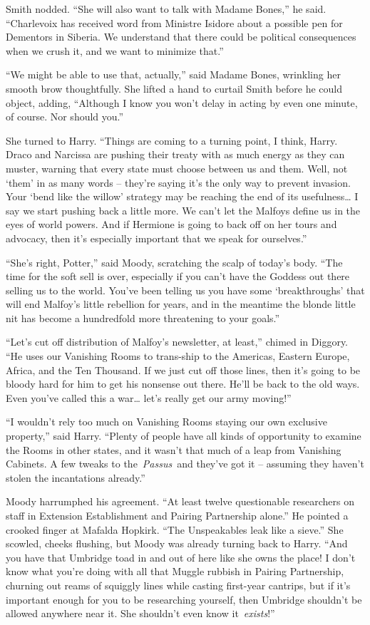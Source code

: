 Smith nodded. ``She will also want to talk with Madame Bones,'' he said.
``Charlevoix has received word from Ministre Isidore about a possible
pen for Dementors in Siberia. We understand that there could be
political consequences when we crush it, and we want to minimize that.''

``We might be able to use that, actually,'' said Madame Bones, wrinkling
her smooth brow thoughtfully. She lifted a hand to curtail Smith before
he could object, adding, ``Although I know you won't delay in acting by
even one minute, of course. Nor should you.''

She turned to Harry. ``Things are coming to a turning point, I think,
Harry. Draco and Narcissa are pushing their treaty with as much energy
as they can muster, warning that every state must choose between us and
them. Well, not `them' in as many words -- they're saying it's the only
way to prevent invasion. Your `bend like the willow' strategy may be
reaching the end of its usefulness\ldots{} I say we start pushing back a
little more. We can't let the Malfoys define us in the eyes of world
powers. And if Hermione is going to back off on her tours and advocacy,
then it's especially important that we speak for ourselves.''

``She's right, Potter,'' said Moody, scratching the scalp of today's
body. ``The time for the soft sell is over, especially if you can't have
the Goddess out there selling us to the world. You've been telling us
you have some `breakthroughs' that will end Malfoy's little rebellion
for years, and in the meantime the blonde little nit has become a
hundredfold more threatening to your goals.''

``Let's cut off distribution of Malfoy's newsletter, at least,'' chimed
in Diggory. ``He uses our Vanishing Rooms to trans-ship to the Americas,
Eastern Europe, Africa, and the Ten Thousand. If we just cut off those
lines, then it's going to be bloody hard for him to get his nonsense out
there. He'll be back to the old ways. Even you've called this a
war\ldots{} let's really get our army moving!''

``I wouldn't rely too much on Vanishing Rooms staying our own exclusive
property,'' said Harry. ``Plenty of people have all kinds of opportunity
to examine the Rooms in other states, and it wasn't that much of a leap
from Vanishing Cabinets. A few tweaks to the~\emph{Passus}~and they've
got it -- assuming they haven't stolen the incantations already.''

Moody harrumphed his agreement. ``At least twelve questionable
researchers on staff in Extension Establishment and Pairing Partnership
alone.'' He pointed a crooked finger at Mafalda Hopkirk. ``The
Unspeakables leak like a sieve.'' She scowled, cheeks flushing, but
Moody was already turning back to Harry. ``And you have that Umbridge
toad in and out of here like she owns the place! I don't know what
you're doing with all that Muggle rubbish in Pairing Partnership,
churning out reams of squiggly lines while casting first-year cantrips,
but if it's important enough for you to be researching yourself, then
Umbridge shouldn't be allowed anywhere near it. She shouldn't even know
it~\emph{exists}!''


